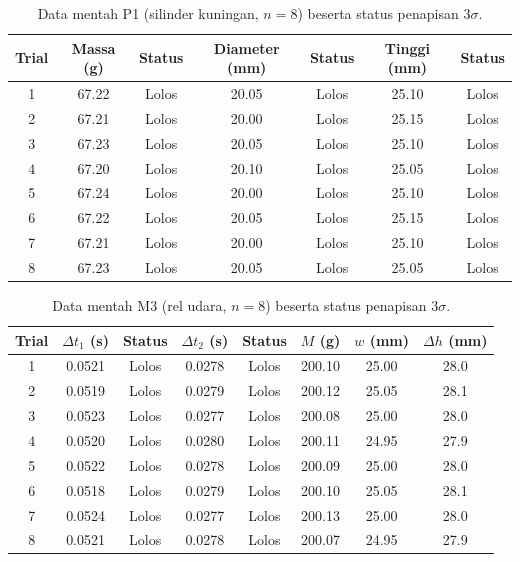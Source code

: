\begin{table}[H]
\centering
\singlespacing
\caption{Data mentah P1 (silinder kuningan, $n=8$) beserta status penapisan $3\sigma$.}
\label{tab:p1}
\small
\begin{tabular}{c S[table-format=2.2] c S[table-format=2.2] c S[table-format=2.2] c}
\toprule
\textbf{Trial} & {\textbf{Massa (g)}} & \textbf{Status} & {\textbf{Diameter (mm)}} & \textbf{Status} & {\textbf{Tinggi (mm)}} & \textbf{Status} \\
 & 67.22 & Lolos & 20.05 & Lolos & 25.10 & Lolos \\
2 & 67.21 & Lolos & 20.00 & Lolos & 25.15 & Lolos \\
3 & 67.23 & Lolos & 20.05 & Lolos & 25.10 & Lolos \\
4 & 67.20 & Lolos & 20.10 & Lolos & 25.05 & Lolos \\
5 & 67.24 & Lolos & 20.00 & Lolos & 25.10 & Lolos \\
6 & 67.22 & Lolos & 20.05 & Lolos & 25.15 & Lolos \\
7 & 67.21 & Lolos & 20.00 & Lolos & 25.10 & Lolos \\
8 & 67.23 & Lolos & 20.05 & Lolos & 25.05 & Lolos \\
\bottomrule
\end{tabular}
\end{table}

\begin{table}[H]
\centering
\singlespacing
\caption{Data mentah M3 (rel udara, $n=8$) beserta status penapisan $3\sigma$.}
\label{tab:m3}
\small
\begin{tabular}{c S[table-format=1.4] c S[table-format=1.4] c S[table-format=3.2] S[table-format=2.2] S[table-format=2.1]}
\toprule
\textbf{Trial} & {$\Delta t_1$ (s)} & \textbf{Status} & {$\Delta t_2$ (s)} & \textbf{Status} & {$M$ (g)} & {$w$ (mm)} & {$\Delta h$ (mm)} \\
 & 0.0521 & Lolos & 0.0278 & Lolos & 200.10 & 25.00 & 28.0 \\
2 & 0.0519 & Lolos & 0.0279 & Lolos & 200.12 & 25.05 & 28.1 \\
3 & 0.0523 & Lolos & 0.0277 & Lolos & 200.08 & 25.00 & 28.0 \\
4 & 0.0520 & Lolos & 0.0280 & Lolos & 200.11 & 24.95 & 27.9 \\
5 & 0.0522 & Lolos & 0.0278 & Lolos & 200.09 & 25.00 & 28.0 \\
6 & 0.0518 & Lolos & 0.0279 & Lolos & 200.10 & 25.05 & 28.1 \\
7 & 0.0524 & Lolos & 0.0277 & Lolos & 200.13 & 25.00 & 28.0 \\
8 & 0.0521 & Lolos & 0.0278 & Lolos & 200.07 & 24.95 & 27.9 \\
\bottomrule
\end{tabular}
\end{table}
